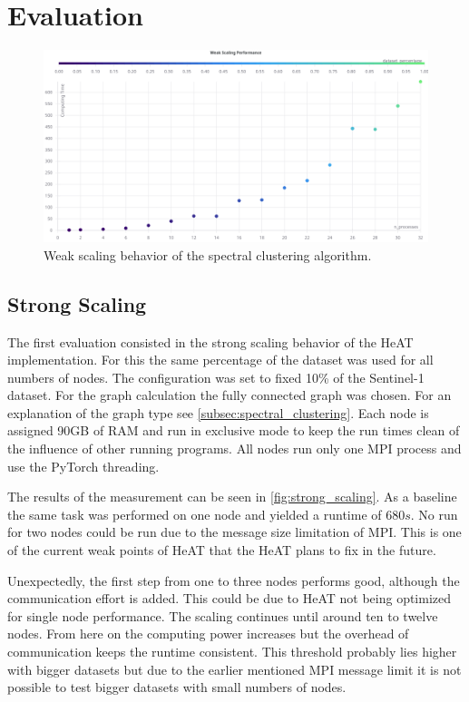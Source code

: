 \section{Evaluation}
\label{sec:evaluation}


\begin{figure}
  \centering
  \includegraphics[width=0.9\linewidth]{images/weak_scaling_chart.png}
  \caption{Weak scaling behavior of the spectral clustering algorithm.}\label{fig:weak_scaling}
\end{figure}


\subsection{Strong Scaling}
\label{subsec:strong_scaling}


The first evaluation consisted in the strong scaling behavior of the \gls{HeAT} implementation.
For this the same percentage of the dataset was used for all numbers of nodes.
The configuration was set to fixed 10\% of the Sentinel-1 dataset.
For the graph calculation the fully connected graph was chosen. For an explanation of the graph type see \cref{subsec:spectral_clustering}.
Each node is assigned 90GB of \gls{RAM} and run in exclusive mode to keep the run times clean of the influence of other running programs.
All nodes run only one \gls{MPI} process and use the \gls{PyTorch} threading.

The results of the measurement can be seen in \cref{fig:strong_scaling}. As a baseline the same task was performed on one node and yielded a runtime of \(680s\).
No run for two nodes could be run due to the message size limitation of \gls{MPI}. This is one of the current weak points
of \gls{HeAT} that the \gls{HeAT} plans to fix in the future.

Unexpectedly, the first step from one to three nodes performs good, although the communication effort is added.
This could be due to \gls{HeAT} not being optimized for single node performance.
The scaling continues until around ten to twelve nodes.
From here on the computing power increases but the overhead of communication keeps the runtime consistent.
This threshold probably lies higher with bigger datasets but due to the earlier mentioned \gls{MPI} message limit it is not possible to test
bigger datasets with small numbers of nodes.

